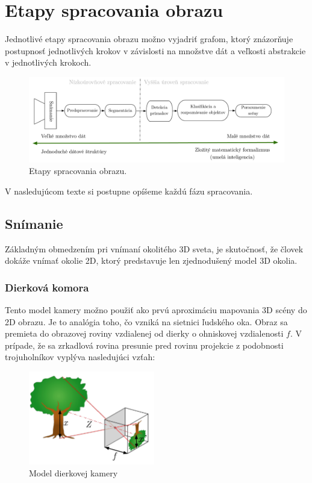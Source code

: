 \section{Etapy spracovania obrazu}

Jednotlivé etapy spracovania obrazu možno vyjadriť grafom, ktorý znázorňuje postupnosť jednotlivých krokov v závislosti na množstve dát a veľkosti abstrakcie v jednotlivých krokoch. \cite{Analysis_and_Machine_Vision} 

\begin{figure}[H]
\begin{center}
	\includegraphics[scale=0.45]{images/phaseCV}
	\caption{Etapy spracovania obrazu.}
	\end{center}
\end{figure}

V nasledujúcom texte si postupne opíšeme každú fázu spracovania. 


\subsection{Snímanie}
Základným obmedzením pri vnímaní okolitého 3D sveta, je skutočnosť, že človek dokáže vnímať okolie 2D, ktorý predstavuje len zjednodušený model 3D okolia.


\subsubsection{Dierková komora} Tento model kamery možno použiť ako prvú aproximáciu mapovania 3D scény do 2D obrazu. Je to analógia toho, čo vzniká na sietnici ľudského oka. Obraz sa premieta do obrazovej roviny vzdialenej od dierky o ohniskovej vzdialenosti $f$. V prípade, že sa zrkadlová rovina presunie pred rovinu projekcie z podobnosti trojuholníkov vyplýva nasledujúci vzťah:\cite{Pin_hole_camera}\cite{pocitacove_videnie_v_praxi}



\begin{figure}[H]
\begin{center}
	\includegraphics[width=5.5cm]{images/holeCamera}
	\caption{Model dierkovej kamery}
	\end{center}
\end{figure}

